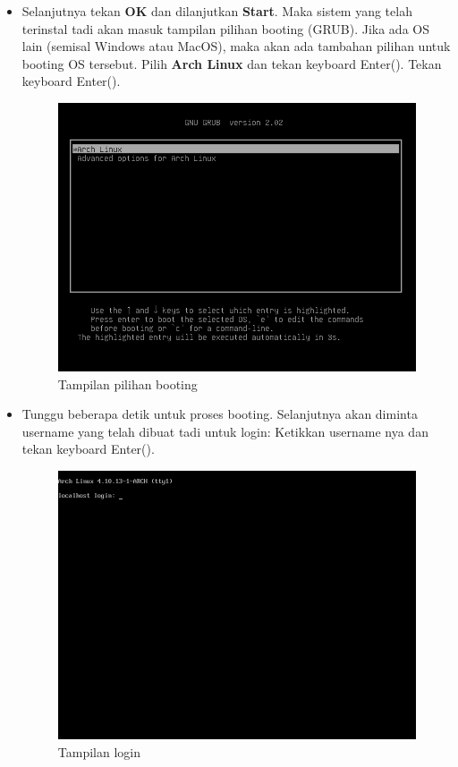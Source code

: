 \documentclass[12pt,]{article}
\begin{document}
\begin{itemize}
		\item Selanjutnya tekan \textbf{OK} dan dilanjutkan \textbf{Start}.
		Maka sistem yang telah terinstal tadi akan masuk tampilan pilihan booting (GRUB).
		Jika ada OS lain (semisal Windows atau MacOS), maka akan ada tambahan pilihan untuk booting OS tersebut.
		Pilih \textbf{Arch Linux} dan tekan keyboard Enter(\keys{\return}).
		Tekan keyboard Enter(\keys{\return}).
		\begin{figure}[H]
			\centering
			\includegraphics[width=0.6\linewidth]{images/vbox_afterinstall/s3}
			\caption{Tampilan pilihan booting}
		\end{figure}
	
		\item Tunggu beberapa detik untuk proses booting.
		Selanjutnya akan diminta username yang telah dibuat tadi untuk login:
		Ketikkan username nya dan tekan keyboard Enter(\keys{\return}).
		\begin{figure}[H]
			\centering
			\includegraphics[width=0.6\linewidth]{images/vbox_afterinstall/s4}
			\caption{Tampilan login}
		\end{figure}
	

\end{itemize}
\end{document}
